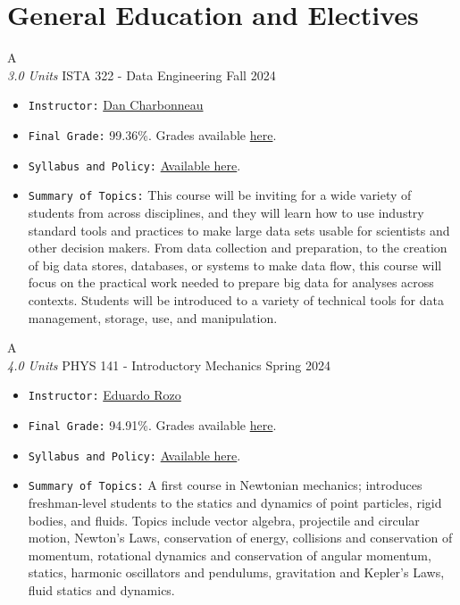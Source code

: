 \section{General Education and Electives}

\cventry
{A \\ \small{\textit{3.0 Units}}}
{ISTA 322 - Data Engineering}
{Fall 2024}
{}
{}
{
  \begin{itemize}
    \item \texttt{Instructor:} \href{https://infosci.arizona.edu/person/dan-charbonneau}{Dan Charbonneau}
    \item \texttt{Final Grade:} 99.36\%. Grades available \href{https://mhrezaei.com/assets/cv/courses/Fall2024/ISTA322/Grades.pdf}{here}.
    \item \texttt{Syllabus and Policy:} \href{https://mhrezaei.com/assets/cv/courses/Fall2024/ISTA322/Syllabus.pdf}{Available here}.
    \item \texttt{Summary of Topics:} This course will be inviting for a wide variety of students from across disciplines, and they will learn how to use industry standard tools and practices to make large data sets usable for scientists and other decision makers. From data collection and preparation, to the creation of big data stores, databases, or systems to make data flow, this course will focus on the practical work needed to prepare big data for analyses across contexts. Students will be introduced to a variety of technical tools for data management, storage, use, and manipulation.
  \end{itemize}
}


\cventry
{A \\ \small{\textit{4.0 Units}}}
{PHYS 141 - Introductory Mechanics}
{Spring 2024}
{}
{}
{
  \begin{itemize}
    \item \texttt{Instructor:} \href{https://w3.physics.arizona.edu/people/eduardo-rozo}{Eduardo Rozo}
    \item \texttt{Final Grade:} 94.91\%. Grades available \href{https://mhrezaei.com/assets/cv/courses/Spring2024/PHYS141/Grades.pdf}{here}.
    \item \texttt{Syllabus and Policy:} \href{https://mhrezaei.com/assets/cv/courses/Spring2024/PHYS141/Syllabus.pdf}{Available here}.
    \item \texttt{Summary of Topics:} A first course in Newtonian mechanics; introduces freshman-level students to the statics and dynamics of point particles, rigid bodies, and fluids. Topics include vector algebra, projectile and circular motion, Newton's Laws, conservation of energy, collisions and conservation of momentum, rotational dynamics and conservation of angular momentum, statics, harmonic oscillators and pendulums, gravitation and Kepler's Laws, fluid statics and dynamics.
  \end{itemize}
}


